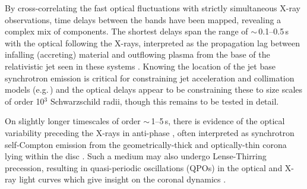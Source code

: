 \documentclass{pasa}%
\begin{document}


By cross-correlating the fast optical fluctuations with strictly simultaneous X-ray observations, time delays between the bands have been mapped, revealing a complex mix of components. The shortest delays span the range of $\sim$\,0.1--0.5\,s with the optical following the X-rays, interpreted as the propagation lag between infalling (accreting) material and outflowing plasma from the base of the relativistic jet seen in these systems \citep{kanbach01,malzac04,gandhi10}. Knowing the location of the jet base synchrotron emission is critical for constraining jet acceleration and collimation models (e.g.\,\citealt{markoff05}) and the optical delays appear to be constraining these to size scales of order 10$^3$ Schwarzschild radii, though this remains to be tested in detail. 

On slightly longer timescales of order $\sim$\,1--5\,s, there is evidence of the optical variability preceding the X-rays in anti-phase \citep{kanbach01,durant08,gandhi10,pahari17}, often interpreted as synchrotron self-Compton emission from the geometrically-thick and optically-thin corona lying within the disc \citep{hynes03,yuan05, gandhi10, veledina11}. Such a medium may also undergo Lense-Thirring precession, resulting in quasi-periodic oscillations (QPOs) in the optical and X-ray light curves which give insight on the coronal dynamics \citep{hynes03,ingram09,gandhi10}. 
\end{document}
